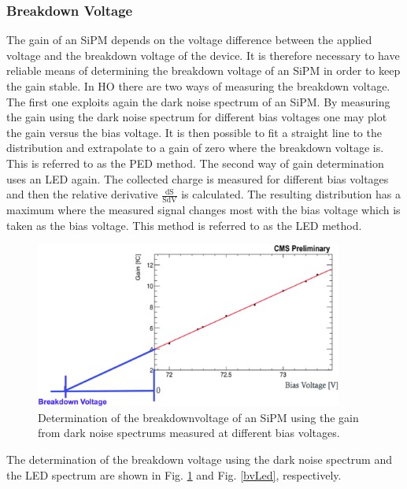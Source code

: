 \subsubsection{Breakdown Voltage}
The gain of an SiPM depends on the voltage difference between the applied voltage and the breakdown voltage of the device. It is therefore necessary to have reliable means of determining the breakdown voltage of an SiPM in order to keep the gain stable. In HO there are two ways of measuring the breakdown voltage. The first one exploits again the dark noise spectrum of an SiPM. By measuring the gain using the dark noise spectrum for different bias voltages one may plot the gain versus the bias voltage. It is then possible to fit a straight line to the distribution and extrapolate to a gain of zero where the breakdown voltage is. This is referred to as the PED method. The second way of gain determination uses an LED again. The collected charge is measured for different bias voltages and then the relative derivative $\frac{\text{dS}}{\text{SdV}}$ is calculated. The resulting distribution has a maximum where the measured signal changes most with the bias voltage which is taken as the bias voltage. This method is referred to as the LED method.
\begin{figure}[bh]
\centering
\includegraphics[width=0.9\textwidth]{Figures/kuensken/bvPedDetermination.png}
\caption{Determination of the breakdownvoltage of an SiPM using the gain from dark noise spectrums measured at different bias voltages.}
\label{bvPed}
\end{figure}
The determination of the breakdown voltage using the dark noise spectrum and the LED spectrum are shown in Fig. \ref{bvPed} and Fig. \ref{bvLed}, respectively.
